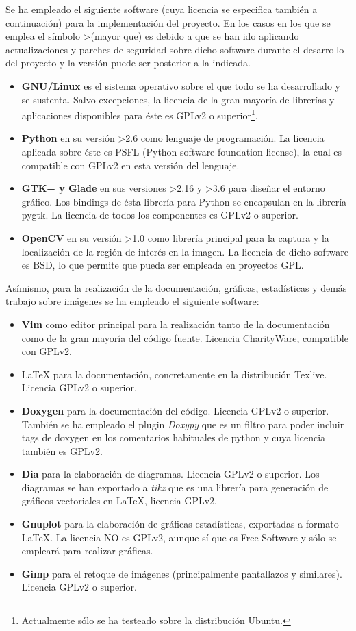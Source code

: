 Se ha empleado el siguiente software (cuya licencia se especifica también a continuación) para la implementación del proyecto. En los casos en los que se emplea el símbolo \textgreater (mayor que) es debido a que se han ido aplicando actualizaciones y parches de seguridad sobre dicho software durante el desarrollo del proyecto y la versión puede ser posterior a la indicada.
\begin{itemize}
	\item{\textbf{GNU/Linux} es el sistema operativo sobre el que todo se ha desarrollado y se sustenta. Salvo excepciones, la licencia de la gran mayoría de librerías y aplicaciones disponibles para éste es GPLv2 o superior\footnote{Actualmente sólo se ha testeado sobre la distribución Ubuntu.}.}
	\item{\textbf{Python} en su versión \textgreater2.6 como lenguaje de programación. La licencia aplicada sobre éste es PSFL (Python software foundation license), la cual es compatible con GPLv2 en esta versión del lenguaje.}
	\item{\textbf{GTK+ y Glade} en sus versiones \textgreater2.16 y \textgreater3.6 para diseñar el entorno gráfico. Los bindings de ésta librería para Python se encapsulan en la librería pygtk. La licencia de todos los componentes es GPLv2 o superior.}
	\item{\textbf{OpenCV} en su versión \textgreater1.0 como librería principal para la captura y la localización de la región de interés en la imagen. La licencia de dicho software es BSD, lo que permite que pueda ser empleada en proyectos GPL.}
\end{itemize}
Asímismo, para la realización de la documentación, gráficas, estadísticas y demás trabajo sobre imágenes se ha empleado el siguiente software:
\begin{itemize}
	\item{\textbf{Vim} como editor principal para la realización tanto de la documentación como de la gran mayoría del código fuente. Licencia CharityWare, compatible con GPLv2.}
	\item{\LaTeX{} para la documentación, concretamente en la distribución Texlive. Licencia GPLv2 o superior.}
	\item{\textbf{Doxygen} para la documentación del código. Licencia GPLv2 o superior. También se ha empleado el plugin \textit{Doxypy} que es un filtro para poder incluir tags de doxygen en los comentarios habituales de python y cuya licencia también es GPLv2.}
	\item{\textbf{Dia} para la elaboración de diagramas. Licencia GPLv2 o superior. Los diagramas se han exportado a \textit{tikz} que es una librería para generación de gráficos vectoriales en \LaTeX{}, licencia GPLv2. }
	\item{\textbf{Gnuplot} para la elaboración de gráficas estadísticas, exportadas a formato \LaTeX{}. La licencia NO es GPLv2, aunque sí que es Free Software y sólo se empleará para realizar gráficas.}
	\item{\textbf{Gimp} para el retoque de imágenes (principalmente pantallazos y similares). Licencia GPLv2 o superior.}
\end{itemize}

